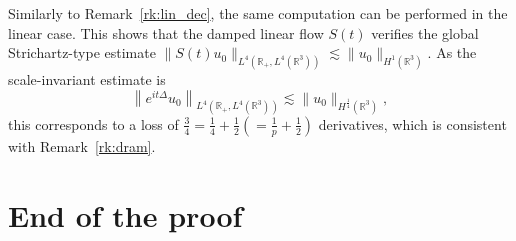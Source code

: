 \documentclass[AHL,Unicode,longabstracts,published]{cedram}
\newcommand*\R{\mathbb{R}}
\begin{document}
\begin{rema}
Similarly to Remark~\ref{rk:lin_dec}, the same computation can be performed in the linear case. This shows that the damped linear flow $S(t)$ verifies the global Strichartz-type estimate $\| S(t) u_0 \|_{L^4(\R_+, L^4(\R^3))} \lesssim \| u_0 \|_{H^1(\R ^3)}$. As the scale-invariant estimate is
\[
\left\| e^{it\Delta} u_0\right\|_{L^4(\R_+, L^4(\R^3))} \lesssim \| u_0 \|_{H^{\frac 14}(\R^3)},
\]
this corresponds to a loss of $\frac 34 = \frac 14 + \frac 12 (= \frac 1p + \frac 12)$ derivatives, which is consistent with Remark~\ref{rk:dram}.
\end{rema}



\section{End of the proof}\label{secEnd}
\end{document}
